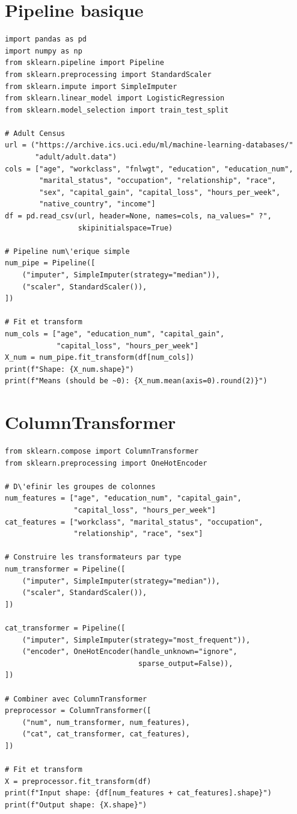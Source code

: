 \section{Pipeline basique}

\begin{verbatim}
import pandas as pd
import numpy as np
from sklearn.pipeline import Pipeline
from sklearn.preprocessing import StandardScaler
from sklearn.impute import SimpleImputer
from sklearn.linear_model import LogisticRegression
from sklearn.model_selection import train_test_split

# Adult Census
url = ("https://archive.ics.uci.edu/ml/machine-learning-databases/"
       "adult/adult.data")
cols = ["age", "workclass", "fnlwgt", "education", "education_num",
        "marital_status", "occupation", "relationship", "race",
        "sex", "capital_gain", "capital_loss", "hours_per_week",
        "native_country", "income"]
df = pd.read_csv(url, header=None, names=cols, na_values=" ?",
                 skipinitialspace=True)

# Pipeline num\'erique simple
num_pipe = Pipeline([
    ("imputer", SimpleImputer(strategy="median")),
    ("scaler", StandardScaler()),
])

# Fit et transform
num_cols = ["age", "education_num", "capital_gain",
            "capital_loss", "hours_per_week"]
X_num = num_pipe.fit_transform(df[num_cols])
print(f"Shape: {X_num.shape}")
print(f"Means (should be ~0): {X_num.mean(axis=0).round(2)}")
\end{verbatim}

\section{ColumnTransformer}

\begin{verbatim}
from sklearn.compose import ColumnTransformer
from sklearn.preprocessing import OneHotEncoder

# D\'efinir les groupes de colonnes
num_features = ["age", "education_num", "capital_gain",
                "capital_loss", "hours_per_week"]
cat_features = ["workclass", "marital_status", "occupation",
                "relationship", "race", "sex"]

# Construire les transformateurs par type
num_transformer = Pipeline([
    ("imputer", SimpleImputer(strategy="median")),
    ("scaler", StandardScaler()),
])

cat_transformer = Pipeline([
    ("imputer", SimpleImputer(strategy="most_frequent")),
    ("encoder", OneHotEncoder(handle_unknown="ignore",
                               sparse_output=False)),
])

# Combiner avec ColumnTransformer
preprocessor = ColumnTransformer([
    ("num", num_transformer, num_features),
    ("cat", cat_transformer, cat_features),
])

# Fit et transform
X = preprocessor.fit_transform(df)
print(f"Input shape: {df[num_features + cat_features].shape}")
print(f"Output shape: {X.shape}")
\end{verbatim}


